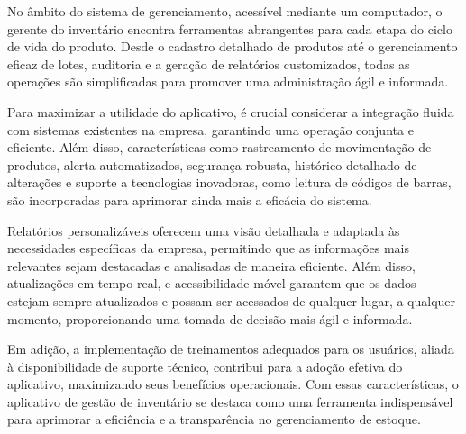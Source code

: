 No âmbito do sistema de gerenciamento, acessível mediante um computador, o gerente do inventário encontra ferramentas abrangentes para cada etapa do ciclo de vida do produto. Desde o cadastro detalhado de produtos até o gerenciamento eficaz de lotes, auditoria e a geração de relatórios customizados, todas as operações são simplificadas para promover uma administração ágil e informada.

Para maximizar a utilidade do aplicativo, é crucial considerar a integração fluida com sistemas existentes na empresa, garantindo uma operação conjunta e eficiente. Além disso, características como rastreamento de movimentação de produtos, alerta automatizados, segurança robusta, histórico detalhado de alterações e suporte a tecnologias inovadoras, como leitura de códigos de barras, são incorporadas para aprimorar ainda mais a eficácia do sistema.

Relatórios personalizáveis oferecem uma visão detalhada e adaptada às necessidades específicas da empresa, permitindo que as informações mais relevantes sejam destacadas e analisadas de maneira eficiente. Além disso, atualizações em tempo real, e acessibilidade móvel garantem que os dados estejam sempre atualizados e possam ser acessados de qualquer lugar, a qualquer momento, proporcionando uma tomada de decisão mais ágil e informada.

Em adição, a implementação de treinamentos adequados para os usuários, aliada à disponibilidade de suporte técnico, contribui para a adoção efetiva do aplicativo, maximizando seus benefícios operacionais. Com essas características, o aplicativo de gestão de inventário se destaca como uma ferramenta indispensável para aprimorar a eficiência e a transparência no gerenciamento de estoque.




